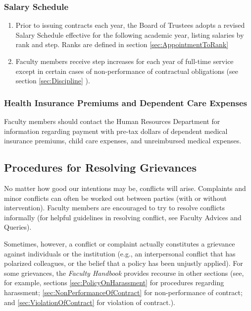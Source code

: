 		\subsubsection{Salary Schedule}
			\begin{enumerate}[label=\alph*)]
				\item{Prior to issuing contracts each year, the Board of Trustees adopts a revised Salary Schedule effective for the following academic year, listing salaries by rank and step.  Ranks are defined in
					section
					\ref{sec:AppointmentToRank}
				}

				\item{Faculty members receive step increases for each year of full-time service except in certain cases of non-performance of contractual obligations
					(see section \ref{sec:Discipline} ).

				}
			\end{enumerate}
		\subsubsection{Health Insurance Premiums and Dependent Care Expenses}

			Faculty members should contact the Human Resources Department for information
			regarding payment with pre-tax dollars of dependent medical insurance premiums,
			child care expenses, and unreimbursed medical expenses.

	\subsection{Procedures for Resolving Grievances}
		\label{sec:ResolvingGrievances}


		No matter how good our intentions may be, conflicts will arise.
		Complaints and minor conflicts can often be worked out between
		parties (with or without intervention).  Faculty members are
		encouraged to try to resolve conflicts informally (for helpful
		guidelines in resolving conflict, see Faculty Advices and Queries).

		Sometimes, however, a conflict or complaint actually constitutes a
		grievance against individuals or the institution (e.g., an
		interpersonal conflict that has polarized colleagues, or the belief
		that a policy has been unjustly applied).  For some grievances, the
		\emph{Faculty Handbook} provides recourse in other sections (see,
		for example,
		sections
		\ref{sec:PolicyOnHarassment}
		for procedures regarding harassment;
		\ref{sec:NonPerformanceOfContract}
		for non-performance of contract; and
		\ref{sec:ViolationOfContract}
		for violation
		of contract.).

